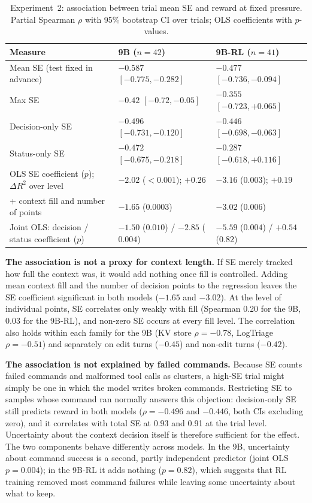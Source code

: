\documentclass{article}
\begin{document}
\begin{table}[!ht]
  \centering
  \small
  \caption{Experiment~2: association between trial mean SE and reward at fixed pressure.
  Partial Spearman $\rho$ with 95\% bootstrap CI over trials; OLS coefficients with $p$-values.}
  \label{tab:h1}
  \begin{tabular}{@{}lll@{}}
    \toprule
    Measure & 9B ($n=42$) & 9B-RL ($n=41$) \\
    \midrule
    Mean SE (test fixed in advance) & $\mathbf{-0.587}$ $[-0.775,-0.282]$ & $\mathbf{-0.477}$ $[-0.736,-0.094]$ \\
    Max SE & $-0.42$ $[-0.72,-0.05]$ & $-0.355$ $[-0.723,+0.065]$ \\
    Decision-only SE & $-0.496$ $[-0.731,-0.120]$ & $-0.446$ $[-0.698,-0.063]$ \\
    Status-only SE & $-0.472$ $[-0.675,-0.218]$ & $-0.287$ $[-0.618,+0.116]$ \\
    \midrule
    OLS SE coefficient ($p$); $\Delta R^2$ over level & $-2.02$ ($<0.001$); $+0.26$ & $-3.16$ ($0.003$); $+0.19$ \\
    \quad + context fill and number of points & $-1.65$ ($0.0003$) & $-3.02$ ($0.006$) \\
    Joint OLS: decision / status coefficient ($p$) & $-1.50$ ($0.010$) / $-2.85$ ($0.004$) & $-5.59$ ($0.004$) / $+0.54$ ($0.82$) \\
    \bottomrule
  \end{tabular}
\end{table}

\textbf{The association is not a proxy for context length.} If SE merely tracked how full the context was, it would add nothing once fill is controlled.
Adding mean context fill and the number of decision points to the regression leaves the SE coefficient significant in both models ($-1.65$ and $-3.02$).
At the level of individual points, SE correlates only weakly with fill (Spearman 0.20 for the 9B, 0.03 for the 9B-RL), and non-zero SE occurs at every fill level.
The correlation also holds within each family for the 9B (KV store $\rho=-0.78$, LogTriage $\rho=-0.51$) and separately on edit turns ($-0.45$) and non-edit turns ($-0.42$).

\textbf{The association is not explained by failed commands.} Because SE counts failed commands and malformed tool calls as clusters, a high-SE trial might simply be one in which the model writes broken commands.
Restricting SE to samples whose command ran normally answers this objection: decision-only SE still predicts reward in both models ($\rho=-0.496$ and $-0.446$, both CIs excluding zero), and it correlates with total SE at 0.93 and 0.91 at the trial level.
Uncertainty about the context decision itself is therefore sufficient for the effect.
The two components behave differently across models.
In the 9B, uncertainty about command success is a second, partly independent predictor (joint OLS $p=0.004$); in the 9B-RL it adds nothing ($p=0.82$), which suggests that RL training removed most command failures while leaving some uncertainty about what to keep.
\end{document}
